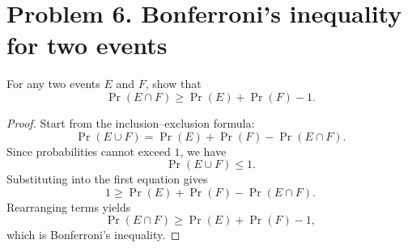 
\section*{Problem 6. Bonferroni's inequality for two events}

For any two events $E$ and $F$, show that
\[
\Pr(E \cap F) \ge \Pr(E) + \Pr(F) - 1.
\]

\begin{proof}
Start from the inclusion--exclusion formula:
\[
\Pr(E \cup F) = \Pr(E) + \Pr(F) - \Pr(E \cap F).
\]
Since probabilities cannot exceed $1$, we have
\[
\Pr(E \cup F) \le 1.
\]
Substituting into the first equation gives
\[
1 \ge \Pr(E) + \Pr(F) - \Pr(E \cap F).
\]
Rearranging terms yields
\[
\Pr(E \cap F) \ge \Pr(E) + \Pr(F) - 1,
\]
which is Bonferroni's inequality.
\end{proof}
